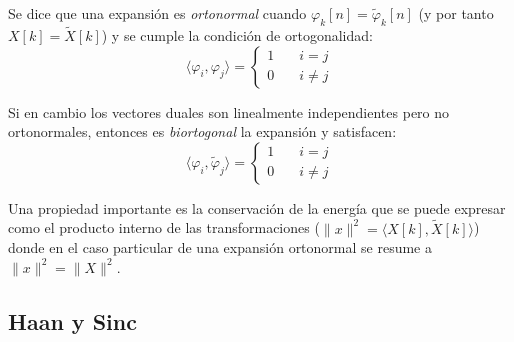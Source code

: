 	Se dice que una expansión es \emph{ortonormal} cuando $\varphi_k[n] = \tilde{\varphi}_k[n]$ (y por tanto $X[k] = \tilde{X}[k]$) y se cumple la condición de ortogonalidad:
		\begin{equation*}
			\langle \varphi_i,\varphi_j \rangle = \begin{cases} 1 &\quad i=j \\ 0 &\quad i\neq j \end{cases}
		\end{equation*}

	Si en cambio los vectores duales son linealmente independientes pero no ortonormales, entonces es \emph{biortogonal} la expansión y satisfacen:
		\begin{equation*}
			\langle \varphi_i,\tilde{\varphi}_j \rangle = \begin{cases} 1 &\quad i=j \\ 0 &\quad i\neq j \end{cases}
		\end{equation*}

		Una propiedad importante es la conservación de la energía que se puede expresar como el producto interno de las transformaciones ($\| x\|^2 = \langle X[k],\tilde{X}[k] \rangle$) donde en el caso particular de una expansión ortonormal se resume a $\|x\|^2 = \|X\|^2$.

		\subsection{Haan y Sinc}
